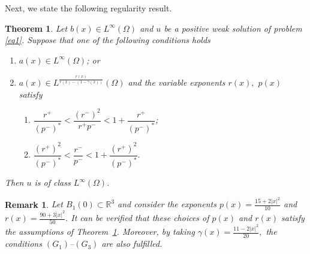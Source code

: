 \documentclass[11pt]{article}
\newtheorem{theorem}{Theorem}[section] %
\newtheorem{remark}{Remark}[section]
\newcommand{\R}{\mathbb{R}}
\newcommand{\ga} {\gamma}
\newcommand{\om} {\Omega}
\begin{document}
Next, we state the following regularity result.

\begin{theorem}\label{reg_result}
 Let
$b(x)\in L^\infty(\om)$
and
$u$
be a positive weak solution of problem \eqref{eq1}.
Suppose that one of the following conditions holds
\begin{enumerate}
    
\item[\textnormal{(a)}]
$a(x) \in L^\infty(\Omega)$; or
    
\item[\textnormal{(b)}]
$a(x) \in L^{
\frac{r(x)}{r(x) - (1 - \ga(x))}}(\Omega)$
and the variable exponents
$r(x),$
$p(x)$
satisfy
    \begin{enumerate}
        
\item[$(i)$]
$\dfrac{r^+}{(p^-)^*} < \dfrac{(r^-)^2}{r^+p^-} 
< 1 + \dfrac{r^+}{(p^-)^*}$;
        
\item[$(ii)$]
$\dfrac{(r^+)^2}{(p^-)^*} < \dfrac{r^-}{p^-}
< 1+\dfrac{(r^+)^2}{(p^-)^*}.$
    \end{enumerate}
\end{enumerate}
 Then
$u$
is of class
$L^\infty(\om)$.
\end{theorem}


\begin{remark}\rm
Let
$B_1(0) \subset \R^3$
and consider the exponents
$p(x) = 
\frac{15 + 2|x|^2}{10}$
and
$r(x) = 
\frac{90 + 3|x|^2}{50}.$
It can be verified that these choices of
$p(x)$
and
$r(x)$
satisfy the assumptions of Theorem~\ref{reg_result}.
Moreover, by taking
$\gamma(x) = 
\frac{11 - 2|x|^2}{20},$
the conditions
$(G_1)$–$(G_3)$
are also fulfilled.
\end{remark}
\end{document}
